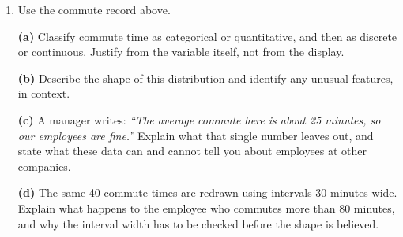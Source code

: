 \documentclass[12pt]{article}
\begin{document}
\begin{enumerate}[leftmargin=1.9em, itemsep=0.12in, resume]

  \item Use the commute record above.

        \boxguard[17]
        \vspace{4pt}
        \textbf{(a)} Classify commute time as categorical or quantitative, and then as discrete
        or continuous. Justify from the variable itself, not from the display.\\[4pt]

        \boxguard[17]
        \vspace{4pt}
        \textbf{(b)} Describe the shape of this distribution and identify any unusual features,
        in context.\\[4pt]

        \boxguard[17]
        \vspace{4pt}
        \textbf{(c)} A manager writes: \emph{``The average commute here is about 25 minutes, so
        our employees are fine.''} Explain what that single number leaves out, and state what
        these data can and cannot tell you about employees at other companies.\\[4pt]

        \boxguard[17]
        \vspace{4pt}
        \textbf{(d)} The same 40 commute times are redrawn using intervals 30 minutes wide.
        Explain what happens to the employee who commutes more than 80 minutes, and why the
        interval width has to be checked before the shape is believed.\\[4pt]

\end{enumerate}
\end{document}
